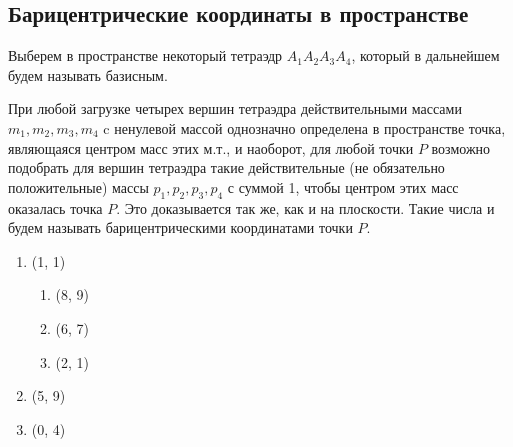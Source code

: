 \documentclass[a4paper,12pt]{article}
\theoremstyle{plain} %
\numberwithin{equation}{section}
\theoremstyle{definition} %
\theoremstyle{remark} %
\begin{document}
\subsection{Барицентрические координаты в пространстве}
\begin{displayquote}
Выберем в пространстве некоторый тетраэдр $A_1A_2A_3A_4$, который в дальнейшем будем называть базисным. 
\end{displayquote}
При любой загрузке четырех вершин тетраэдра действительными массами $m_1, m_2, m_3, m_4$ c ненулевой массой однозначно определена в пространстве точка, являющаяся центром масс этих м.т., и наоборот, для любой точки $P$ возможно подобрать для вершин тетраэдра такие действительные (не обязательно положительные) массы $p_1, p_2, p_3, p_4$ с суммой 1, чтобы центром этих масс оказалась точка $P$. Это доказывается так же, как и на плоскости. Такие числа и будем называть барицентрическими координатами точки $P$.
\begin{enumerate}
    \item (1, 1)
    \begin{enumerate}
        \item (8, 9)
        \item (6, 7) 
        \item (2, 1)
    \end{enumerate}
    \item (5, 9)
    \item (0, 4)
\end{enumerate}
\end{document}
